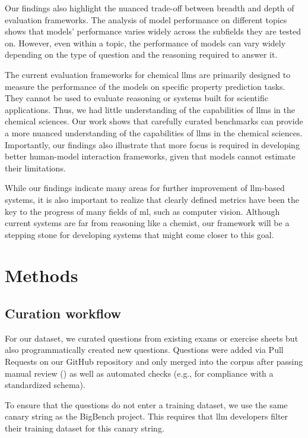 \documentclass[11pt, oneside]{article}
\begin{document}
\begin{refsection}
Our findings also highlight the nuanced trade-off between breadth and depth of evaluation frameworks. 
The analysis of model performance on different topics shows that models' performance varies widely across the subfields they are tested on. 
However, even within a topic, the performance of models can vary widely depending on the type of question and the reasoning required to answer it.

The current evaluation frameworks for chemical \glspl{llm} are primarily designed to measure the performance of the models on specific property prediction tasks. 
They cannot be used to evaluate reasoning or systems built for scientific applications. 
Thus, we had little understanding of the capabilities of \glspl{llm} in the chemical sciences.
Our work shows that carefully curated benchmarks can provide a more nuanced understanding of the capabilities of \glspl{llm} in the chemical sciences.
Importantly, our findings also illustrate that more focus is required in developing better human-model interaction frameworks, given that models cannot estimate their limitations.

While our findings indicate many areas for further improvement of \gls{llm}-based systems, it is also important to realize that clearly defined metrics have been the key to the progress of many fields of \gls{ml}, such as computer vision. 
Although current systems are far from reasoning like a chemist, our \chembench framework will be a stepping stone for developing systems that might come closer to this goal.

\clearpage

\section{Methods}

\subsection{Curation workflow}\label{sec:curation}
For our dataset, we curated questions from existing exams or exercise sheets but also programmatically created new questions.
Questions were added via Pull Requests on our GitHub repository and only merged into the corpus after passing manual review () as well as automated checks (e.g., for compliance with a standardized schema).

To ensure that the questions do not enter a training dataset, we use the same canary string as the BigBench project.
This requires that \Gls{llm} developers filter their training dataset for this canary string.\autocite{openai2024gpt4, srivastava2022beyond}


\end{refsection}
\end{document}
